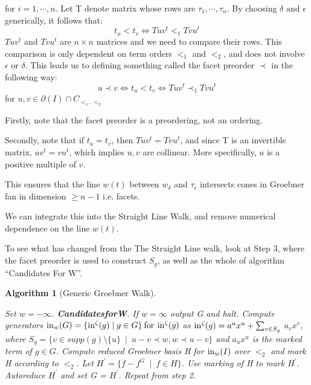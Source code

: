 \documentclass[12pt,a4paper]{report}
\newtheorem{algorithm}{Algorithm}
\begin{document}
for $i = 1, \cdots, n$. Let T denote matrix whose rows are $\tau_{1}, \cdots, \tau_{n}$. By choosing $\delta$ and $\epsilon$ generically, it follows that:
\begin{equation*}
    t_{u} < t_{v} \Longleftrightarrow Tuv^{t} <_{1} Tvu^{t}
\end{equation*}
$Tuv^{t}$ and $Tvu^{t}$ are $n \times n$ matrices and we need to compare their rows. This comparison is only dependent on term orders $<_{1}$ and $<_{2}$, and does not involve $\epsilon$ or $\delta$. This leads us to defining something called the facet preorder $\prec$ in the following way:
\begin{equation*}
    u \prec v \Longleftrightarrow t_{u} < t_{v} \Longleftrightarrow Tuv^{t} \prec_{1} Tvu^{t}
\end{equation*}
for $u, v \in \partial (I) \cap C_{{<_{1}, <_{2}}}$

Firstly, note that the facet preorder is a preordering, not an ordering. 

Secondly, note that if $t_{u} = t_{v}$, then $Tuv^{t} = Tvu^{t}$, and since T is an invertible matrix, $uv^{t} = vu^{t}$, which implies $u, v$ are collinear. More specifically, $u$ is a positive multiple of $v$.


This ensures that the line $w(t)$ between $w_{\delta}$ and $\tau_{\epsilon}$ intersects cones in Groebner fan in dimension $\geq n - 1$ i.e. facets.

We can integrate this into the Straight Line Walk, and remove numerical dependence on the line $w(t)$.

To see what has changed from the The Straight Line walk, look at Step 3, where the facet preorder is used to construct $S_{g}$, as well as the whole of algorithm ``Candidates For W''.


\begin{algorithm}[Generic Groebner Walk]\
 \begin{algorithmic}[1]
    \ENSURE{Reduced Groebner basis for I over $<_{2}$.}
    \STATE Set $w = - \infty.$
    \STATE \textbf{CandidatesforW}. If $w = \infty$ output G and halt.
    \STATE Compute generators $\operatorname{in}_{w} (G) = \{ \operatorname{in}^{\zeta} (g) \mid g \in G \} \: \text{for} \: \operatorname{in}^{\zeta} (g)$ as $\operatorname{in}^{\zeta} (g) = a^{u} x^{u} + \sum_{v \in S_{g}}$ $a_{v} x^{v}$, where $S_{g} = \{ v \in supp(g) \setminus \{ u \} \: \mid \: u - v \prec w, w \prec u - v \}$ and $a_{u}x^{u}$ is the marked term of $g \in G$.
    \STATE Compute reduced Groebner basis H for $\operatorname{in}_{w} (I)$ over $<_{2}$ and mark H according to $<_{2}$.
    \STATE Let $H^{'} = \{ f - f^{G} \: \mid \: f \in H \}$. Use marking of H to mark $H^{'}$.
    \STATE Autoreduce $H^{'}$ and set G = $H^{'}$.
    \STATE Repeat from step 2.
\end{algorithmic}
\end{algorithm}
\end{document}
